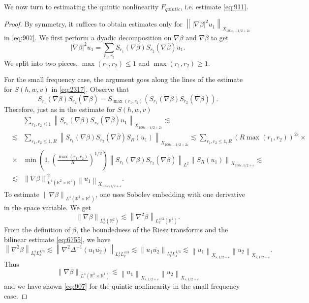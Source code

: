 \documentclass[draft,11pt,leqno]{amsart}
\newcommand{\norm}[2]{{\left\| #1 \right\|}_{#2}}
\newcommand{\De}{\Delta}
\newcommand{\ve}{\varepsilon}
\newcommand{\rone}{\mathbb R^1}
\newcommand{\rtwo}{\mathbb R^2}
\newcommand{\suml}{\sum\limits}
\newcommand{\f}{\displaystyle\frac}
\begin{document}
We now turn to estimating the quintic nonlinearity $F_{quintic}$, i.e.
estimate \eqref{eq:911}.
\begin{proof}  By symmetry, it suffices to obtain  estimates only  for 
$\norm{|\nabla\beta|^2 u_1}{X_{100\ve,-1/2+2\ve}}$  in \eqref{eq:907}.
We first perform a dyadic decomposition on $\nabla\beta$ and 
$\nabla\overline{\beta}$ to get 
$$
|\nabla\beta|^2 u_1=\suml_{r_1,r_2} S_{r_1}(\nabla\beta) 
S_{r_2}(\nabla\overline{\beta}) u_1.
$$
We split into two pieces, $\max(r_1,r_2)\leq 1$ and $\max(r_1,r_2)\geq 1$.

For the small frequency case, the argument goes along the lines of the 
estimate  for $S(h,w,v)$ in \eqref{eq:2317}. Observe that
$$ S_{r_1}(\nabla\beta) 
S_{r_2}(\nabla\overline{\beta})=S_{\max(r_1,r_2)}(S_{r_1}(\nabla\beta) 
S_{r_2}(\nabla\overline{\beta})).$$ 
Therefore, just as in the estimate for $S(h,w,v)$
\begin{eqnarray*}
& &\suml_{r_1,r_2\leq 1}\norm{S_{r_1}(\nabla\beta) 
S_{r_2}(\nabla\overline{\beta})u_1}{X_{100\ve,-1/2+2\ve}}\lesssim \\
&\lesssim&\suml_{r_1,r_2\leq 1, R}\norm{S_{r_1}(\nabla\beta) 
S_{r_2}(\nabla\overline{\beta})S_R(u_1)}{X_{100\ve,-1/2+2\ve}}
\lesssim \suml_{r_1,r_2\leq 1, R} (R\max(r_1,r_2))^{2\ve}\times  \\
&\times &
\min(1,\left(\f{\max(r_1,r_2)}{R}\right)^{1/2})\norm{S_{r_1}(\nabla\beta)
S_{r_2}(\nabla\overline{\beta})}{L^2}\norm{S_R(u_1)}{X_{100\ve,1/2+\ve}}
\lesssim\\
&\lesssim &\norm{\nabla\beta}{L^4(\rtwo\times \rone)}^2
\norm{u_1}{X_{100\ve,1/2+\ve}}.
\end{eqnarray*}
To estimate $\norm{\nabla\beta}{L^4(\rtwo\times \rone)}$, one uses 
Sobolev embedding with one derivative in the space variable. We get
$$
\norm{\nabla\beta}{L^4_x(\rtwo)}\lesssim \norm{\nabla^2\beta}
{L^{4/3}_x(\rtwo)}.
$$ 
From the definition of $\beta$, the boundedness of the Riesz 
transforms and the bilinear estimate \eqref{eq:6755}, we have 
$$
\norm{\nabla^2\beta}
{L^4_tL^{4/3}_x}\lesssim 
\norm{\nabla^2\De^{-1} (u_1\overline{u_2})}{L^4_tL^{4/3}_x}
\lesssim \norm{u_1\overline{u_2}}{L^4_tL^{4/3}_x}
\lesssim \norm{u_1}{X_{\ve,1/2+\ve}}\norm{u_2}{X_{\ve,1/2+\ve}}.
$$ 
Thus 
$$
\norm{\nabla\beta}{L^4(\rtwo\times \rone)}\lesssim 
\norm{u_1}{X_{\ve,1/2+\ve}}\norm{u_2}{X_{\ve,1/2+\ve}}
$$
and we have shown \eqref{eq:907} for the quintic nonlinearity in 
 the small frequency case.


\end{proof}
\end{document}
